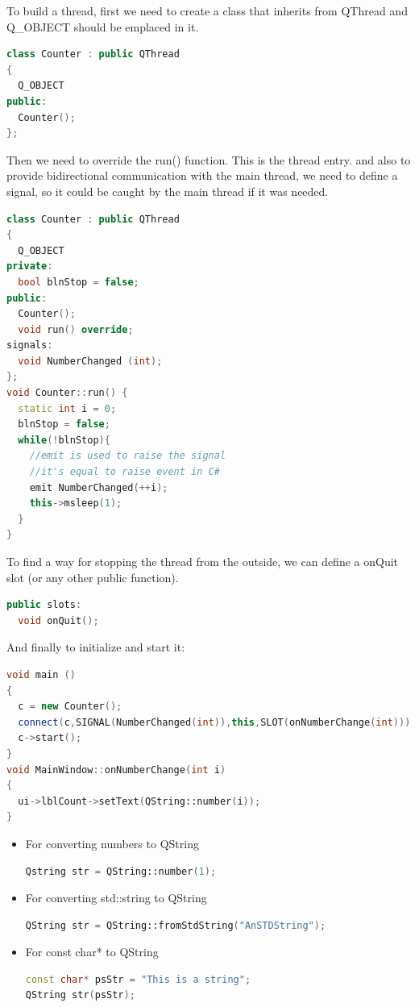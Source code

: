 \begin{note}[Threads]
	
To build a thread, first we need to create a class that inherits from QThread and Q\_OBJECT should be emplaced in it.
\begin{lstlisting}[language = {c++}]
class Counter : public QThread
{
  Q_OBJECT
public:
  Counter();
};
\end{lstlisting}
Then we need to override the run() function. This is the thread entry. and also to provide bidirectional communication with the main thread, we need to define a signal, so it could be caught by the main thread if it was needed.
\begin{lstlisting}[language = {c++}]
class Counter : public QThread
{
  Q_OBJECT
private:
  bool blnStop = false;
public:
  Counter();
  void run() override;
signals:
  void NumberChanged (int);
};
void Counter::run() {
  static int i = 0;
  blnStop = false;
  while(!blnStop){
    //emit is used to raise the signal
    //it's equal to raise event in C#
    emit NumberChanged(++i);
    this->msleep(1);
  }
}
\end{lstlisting}
To find a way for stopping the thread from the outside, we can define a onQuit slot (or any other public function).
\begin{lstlisting}[language = {c++}]
public slots:
  void onQuit();
\end{lstlisting}
And finally to initialize and start it:
\begin{lstlisting}[language = {c++}]
void main ()
{
  c = new Counter();
  connect(c,SIGNAL(NumberChanged(int)),this,SLOT(onNumberChange(int)));
  c->start();
}
void MainWindow::onNumberChange(int i)
{
  ui->lblCount->setText(QString::number(i));
}
\end{lstlisting}
\end{note}
\begin{note}[QString]
\begin{itemize}
\item For converting numbers to QString
\begin{lstlisting}[language = {c++}]
Qstring str = QString::number(1);
\end{lstlisting}
\item For converting std::string to QString
\begin{lstlisting}[language = {c++}]
QString str = QString::fromStdString("AnSTDString");
\end{lstlisting}
\item For const char* to QString
\begin{lstlisting}[language = {c++}]
const char* psStr = "This is a string";
QString str(psStr);
\end{lstlisting}
\end{itemize}
\end{note}


